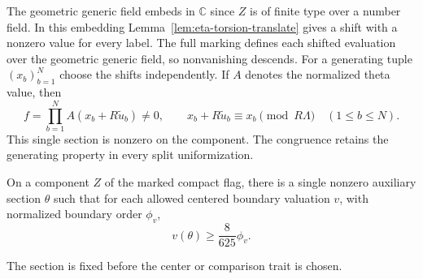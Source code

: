 The geometric
generic field embeds in \(\mathbb C\) since \(Z\) is of finite
type over a number field. In this embedding
Lemma~\ref{lem:eta-torsion-translate} gives a shift with a nonzero
value for every label. The full marking defines each shifted
evaluation over the geometric generic field, so nonvanishing descends.
For a generating tuple \((x_b)_{b=1}^N\) choose the shifts
independently. If \(A\) denotes the normalized theta value, then
\[
 f=\prod_{b=1}^N A(x_b+R\widetilde u_b)\ne0,\qquad
 x_b+R\widetilde u_b\equiv x_b\pmod{R\Lambda}\quad(1\le b\le N).
\]
This single section is nonzero on the component. The congruence
retains the generating property in every split uniformization.
\label{cor:deep-boundary-orders-3}

\begin{lemma}
\label{lem:deep-boundary-uniform-order}
On a component \(Z\) of the marked compact flag, there is a
single nonzero auxiliary section \(\theta\) such that for each allowed centered boundary valuation \(v\), with normalized boundary order \(\phi_v\),
\[
 v(\theta)\ge\frac{8}{625}\phi_v.
\]

The section is fixed before the center or comparison trait is
chosen.
\end{lemma}

